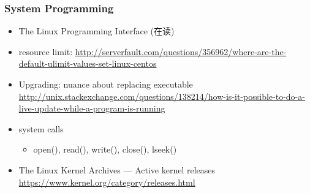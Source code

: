\documentclass{article}
\begin{document}
\subsubsection{System Programming}
%
\begin{itemize}
    \item The Linux Programming Interface (在读)
    \item resource limit: \url{http://serverfault.com/questions/356962/where-are-the-default-ulimit-values-set-linux-centos}
    \item Upgrading: nuance about replacing executable \url{http://unix.stackexchange.com/questions/138214/how-is-it-possible-to-do-a-live-update-while-a-program-is-running}
    \item system calls
        \begin{itemize}
            \item open(), read(), write(), close(), lseek()
        \end{itemize}
    \item The Linux Kernel Archives --- Active kernel releases \url{https://www.kernel.org/category/releases.html}
\end{itemize}
%
\end{document}
